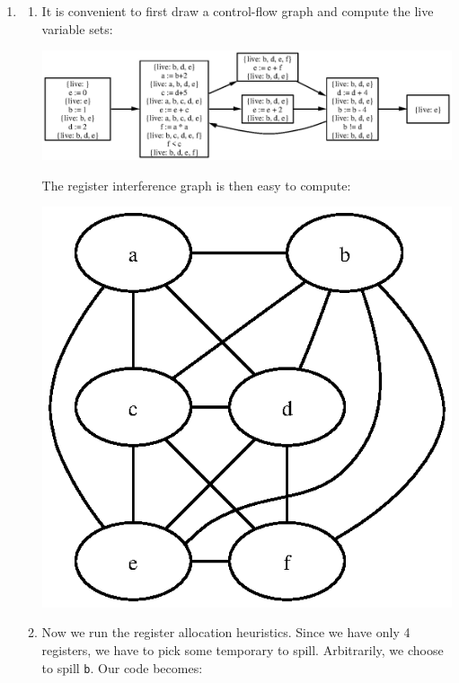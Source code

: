 \documentclass{article}
\begin{document}

\begin{enumerate}
\item
\begin{enumerate}
\item It is convenient to first draw a control-flow graph and compute
the live variable sets:

\begin{center}
\hspace*{-10mm}\includegraphics[angle=0,scale=0.95]{wa10-s1a}
\end{center}

The register interference graph is then easy to compute:

\begin{center}
\includegraphics[angle=0]{wa10-s1b}
\end{center}

\item Now we run the register allocation heuristics.  Since we have
only 4 registers, we have to pick some temporary to spill.
Arbitrarily, we choose to spill \texttt{b}. 
Our code becomes: 


\end{enumerate}
\end{enumerate}
\end{document}
